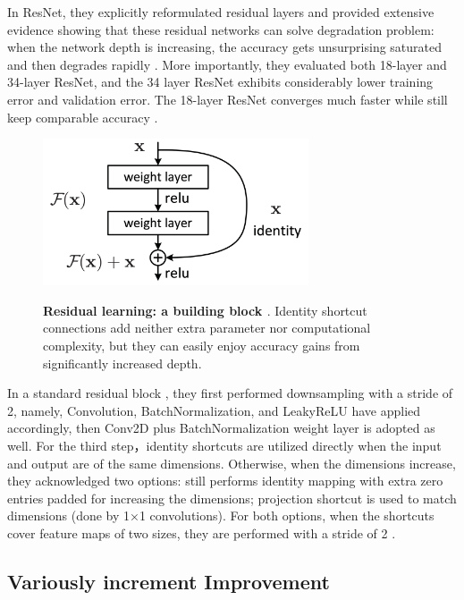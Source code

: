 In ResNet\cite{20}, they explicitly reformulated residual layers and provided extensive evidence showing that these residual networks can solve degradation problem: when the network depth is increasing, the accuracy gets unsurprising saturated and then degrades rapidly \cite{20}.
More importantly, they evaluated both 18-layer and 34-layer ResNet, and the 34 layer ResNet exhibits considerably lower training error and validation error. The 18-layer ResNet converges much faster while still keep comparable accuracy \cite{20}. 

\begin{figure}[t]
\begin{center}
\centering
\includegraphics[width=0.7\textwidth]{thesis-template-master/images/RES.png}
\label{fig:cellnet}

\end{center}
\caption{\textbf{Residual learning: a building block \cite{20}}. Identity shortcut connections add neither extra parameter nor computational complexity, but they can easily enjoy accuracy gains from significantly increased depth.}
\end{figure}

In a standard residual block \cite{20}, they first performed downsampling with a stride of 2, namely, Convolution, BatchNormalization, and  LeakyReLU have applied accordingly, then Conv2D plus BatchNormalization weight layer is adopted as well. For the third step，identity shortcuts are utilized directly when the input and output are of the same dimensions. Otherwise, when the dimensions increase, they acknowledged two options:  still performs identity mapping with extra zero entries padded for increasing the dimensions; projection shortcut is used to match dimensions (done by 1×1 convolutions). For both options, when the shortcuts cover feature maps of two sizes, they are performed with a stride of 2 \cite{20}.


\subsection{ Variously increment Improvement }

